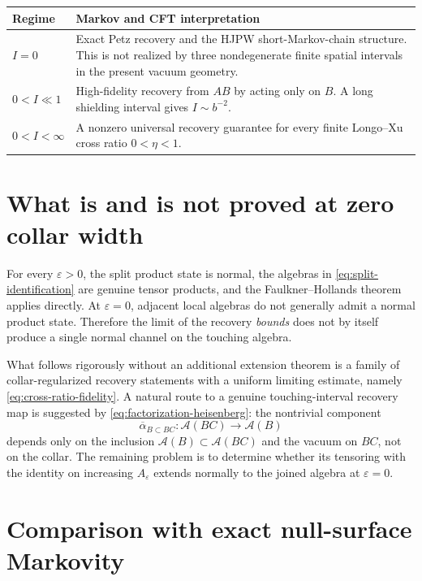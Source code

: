\documentclass[11pt]{article}
\theoremstyle{accenttheorem}
\theoremstyle{definition}
\newcommand{\cA}{\mathcal{A}}
\newcommand{\CMI}{I}
\newcommand{\eps}{\varepsilon}
\newcommand{\1}{\mathbf{1}}
\begin{document}
\begin{center}
\small
\renewcommand{\arraystretch}{1.32}
\begin{tabularx}{0.91\textwidth}{>{\bfseries}p{} X}
\toprule
Regime & Markov and CFT interpretation \\
\midrule
\(\CMI=0\) & Exact Petz recovery and the HJPW short-Markov-chain structure.  This is not realized by three nondegenerate finite spatial intervals in the present vacuum geometry. \\
\(0<\CMI\ll1\) & High-fidelity recovery from \(AB\) by acting only on \(B\).  A long shielding interval gives \(\CMI\sim b^{-2}\). \\
\(0<\CMI<\infty\) & A nonzero universal recovery guarantee for every finite Longo--Xu cross ratio \(0<\eta<1\). \\
\bottomrule
\end{tabularx}
\end{center}

\section{What is and is not proved at zero collar width}

\begin{caveatbox}
For every \(\eps>0\), the split product state is normal, the algebras in \eqref{eq:split-identification} are genuine tensor products, and the Faulkner--Hollands theorem applies directly.  At \(\eps=0\), adjacent local algebras do not generally admit a normal product state.  Therefore the limit of the recovery \emph{bounds} does not by itself produce a single normal channel on the touching algebra.
\end{caveatbox}

What follows rigorously without an additional extension theorem is a family of collar-regularized recovery statements with a uniform limiting estimate, namely \eqref{eq:cross-ratio-fidelity}.  A natural route to a genuine touching-interval recovery map is suggested by \eqref{eq:factorization-heisenberg}: the nontrivial component
\[
 \overline\alpha_{B\subset BC}:\cA(BC)\longrightarrow\cA(B)
\]
depends only on the inclusion \(\cA(B)\subset\cA(BC)\) and the vacuum on \(BC\), not on the collar.  The remaining problem is to determine whether its tensoring with the identity on increasing \(A_\eps\) extends normally to the joined algebra at \(\eps=0\).

\section{Comparison with exact null-surface Markovity}
\end{document}

